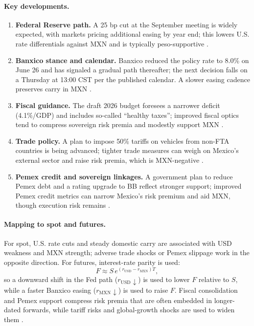 \documentclass[11pt,a4paper]{article} %
\begin{document}
\paragraph{Key developments.}
\begin{enumerate}
  \item \textbf{Federal Reserve path.} A 25 bp cut at the September meeting is widely expected, with markets pricing additional easing by year end; this lowers U.S. rate differentials against MXN and is typically peso-supportive \citep{reuters_fed_poll_2025,reuters_cenbank_graphic_2025}. 
  \item \textbf{Banxico stance and calendar.} Banxico reduced the policy rate to 8.0\% on June 26 and has signaled a gradual path thereafter; the next decision falls on a Thursday at 13:00 CST per the published calendar. A slower easing cadence preserves carry in MXN \citep{reuters_banxico_jun26_2025,banxico_calendar_2025}. 
  \item \textbf{Fiscal guidance.} The draft 2026 budget foresees a narrower deficit (4.1\%/GDP) and includes so-called ``healthy taxes''; improved fiscal optics tend to compress sovereign risk premia and modestly support MXN \citep{reuters_budget_2026_2025}. 
  \item \textbf{Trade policy.} A plan to impose 50\% tariffs on vehicles from non-FTA countries is being advanced; tighter trade measures can weigh on Mexico’s external sector and raise risk premia, which is MXN-negative \citep{reuters_tariffs_autos_2025}. 
  \item \textbf{Pemex credit and sovereign linkages.} A government plan to reduce Pemex debt and a rating upgrade to BB reflect stronger support; improved Pemex credit metrics can narrow Mexico’s risk premium and aid MXN, though execution risk remains \citep{reuters_pemex_plan_2025,reuters_fitch_pemex_2025}. 
\end{enumerate}

\paragraph{Mapping to spot and futures.}
For spot, U.S. rate cuts and steady domestic carry are associated with USD weakness and MXN strength; adverse trade shocks or Pemex slippage work in the opposite direction. For futures, interest-rate parity is used:
\[
F \approx S \, e^{(r_{\mathrm{USD}} - r_{\mathrm{MXN}})T},
\]
so a downward shift in the Fed path (\(r_{\mathrm{USD}}\downarrow\)) is used to lower \(F\) relative to \(S\), while a faster Banxico easing (\(r_{\mathrm{MXN}}\downarrow\)) is used to raise \(F\). Fiscal consolidation and Pemex support compress risk premia that are often embedded in longer-dated forwards, while tariff risks and global-growth shocks are used to widen them \citep{cme_mxn_quotes,cme_fx_overview}.
\end{document}
